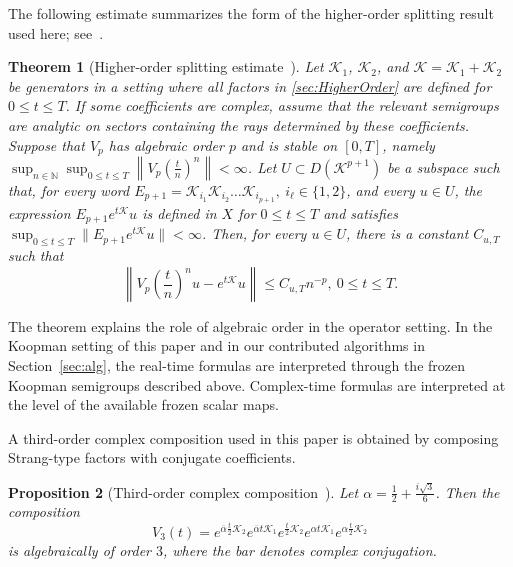 \documentclass[preprint,1p,times,nopreprintline]{elsarticle}
\newtheorem{theorem}{Theorem}
\newtheorem{proposition}[theorem]{Proposition}
\begin{document}
The following estimate summarizes the form of the higher-order splitting result used here; see~\citet{JD5,JD6}.

\begin{theorem}[Higher-order splitting estimate~\citep{JD5,JD6}]
\label{ha}
Let $\mathcal{K}_1$, $\mathcal{K}_2$, and $\mathcal{K}=\mathcal{K}_1+\mathcal{K}_2$ be generators in a setting where all factors in \eqref{sec:HigherOrder} are defined for $0\le t\le T$. If some coefficients are complex, assume that the relevant semigroups are analytic on sectors containing the rays determined by these coefficients. Suppose that $V_p$ has algebraic order $p$ and is stable on $[0,T]$, namely $\sup_{n\in\mathbb{N}}\sup_{0\le t\le T} \left\| V_p\!\left(\frac{t}{n}\right)^n \right\| < \infty$. Let $U\subset D(\mathcal{K}^{p+1})$ be a subspace such that, for every word $E_{p+1} = \mathcal{K}_{i_1}\mathcal{K}_{i_2}\ldots \mathcal{K}_{i_{p+1}},~i_\ell\in\{1,2\}$, and every $u\in U$, the expression $E_{p+1}e^{t\mathcal{K}}u$ is defined in $X$ for $0\le t\le T$ and satisfies $\sup_{0\le t\le T} \bigl\|E_{p+1}e^{t\mathcal{K}}u\bigr\| < \infty$. Then, for every $u\in U$, there is a constant $C_{u,T}$ such that
\[
\left\|
V_p\!\left(\frac{t}{n}\right)^n u
-
e^{t\mathcal{K}}u
\right\|
\le
C_{u,T} n^{-p},
~
0\le t\le T .
\]
\end{theorem}

The theorem explains the role of algebraic order in the operator setting. In the Koopman setting of this paper and in our contributed algorithms in Section~\ref{sec:alg}, the real-time formulas are interpreted through the frozen Koopman semigroups described above. Complex-time formulas are interpreted at the level of the available frozen scalar maps.

A third-order complex composition used in this paper is obtained by composing Strang-type factors with conjugate coefficients.

\begin{proposition}[Third-order complex composition~\citep{JD6,JD7}]
\label{prop333}
Let $\alpha = \frac{1}{2} + \frac{i\sqrt{3}}{6}$.
Then the composition
\begin{equation}
\label{eq2d3o}
V_3(t)
=
e^{\overline{\alpha}\frac{t}{2}\mathcal{K}_2}
e^{\overline{\alpha}t\mathcal{K}_1}
e^{\frac{t}{2}\mathcal{K}_2}
e^{\alpha t\mathcal{K}_1}
e^{\alpha\frac{t}{2}\mathcal{K}_2}
\end{equation}
is algebraically of order $3$, where the bar denotes complex conjugation.
\end{proposition}
\end{document}
